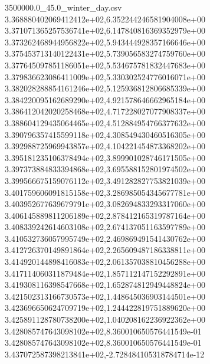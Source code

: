 \begin{filecontents*}{3500000.0_45.0_winter_day.csv}
3.368880402069412412e+02,6.352244246581904008e+00
3.371071365257536741e+02,6.147840816369352979e+00
3.373262468944956822e+02,5.943444928357166646e+00
3.375453713140122431e+02,5.739056583274759760e+00
3.377645097851186051e+02,5.534675781832447683e+00
3.379836623086411009e+02,5.330302524776016071e+00
3.382028288854161246e+02,5.125936812806685339e+00
3.384220095162689290e+02,4.921578646662965184e+00
3.386412042020258468e+02,4.717228027077908337e+00
3.388604129435064465e+02,4.512884954766377632e+00
3.390796357415599118e+02,4.308549430460516305e+00
3.392988725969943857e+02,4.104221454873368202e+00
3.395181235106378494e+02,3.899901028746171505e+00
3.397373884833394868e+02,3.695588152801974502e+00
3.399566675159076112e+02,3.491282827753821039e+00
3.401759606091815158e+02,3.286985054345677781e+00
3.403952677639679791e+02,3.082694833293317060e+00
3.406145889811206189e+02,2.878412165319787164e+00
3.408339242614603108e+02,2.674137051163597789e+00
3.410532736057995749e+02,2.469869491541430762e+00
3.412726370149891864e+02,2.265609487186338811e+00
3.414920144898416083e+02,2.061357038810456288e+00
3.417114060311879484e+02,1.857112147152292891e+00
3.419308116398547668e+02,1.652874812949448824e+00
3.421502313166730573e+02,1.448645036903144501e+00
3.423696650624709719e+02,1.244422819751889620e+00
3.425891128780738200e+02,1.040208162236922362e+00
3.428085747643098102e+02,8.360010650576441549e-01
3.428085747643098102e+02,8.360010650576441549e-01
3.437072587398213841e+02,-2.728484105318784714e-12
\end{filecontents*}

